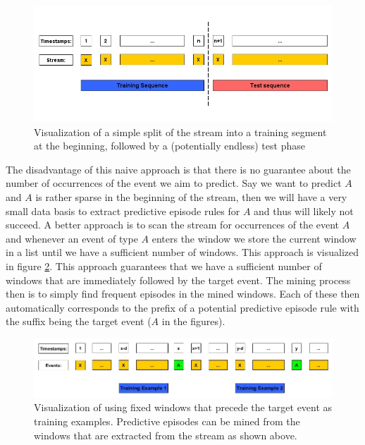 \begin{figure}[h]
	\centering
  	\includegraphics[width=\textwidth]{trainingDataNaive}
	\caption{Visualization of a simple split of the stream into a training segment at the beginning, followed by a (potentially endless) test phase}
	\label{fig_trainingDataNaive}
\end{figure}

The disadvantage of this naive approach is that there is no guarantee about the number of occurrences of the event we aim to predict. Say we want to predict $A$ and $A$ is rather sparse in the beginning of the stream, then we will have a very small data basis to extract predictive episode rules for $A$ and thus will likely not succeed. 
A better approach is to scan the stream for occurrences of the event $A$ and whenever an event of type $A$ enters the window we store the current window in a list until we have a sufficient number of windows. This approach is visualized in figure \ref{fig_trainingDataWindowsOfA}. This approach guarantees that we have a sufficient number of windows that are immediately followed by the target event. The mining process then is to simply find frequent episodes in the mined windows. Each of these then automatically corresponds to the prefix of a potential predictive episode rule with the suffix being the target event ($A$ in the figures).

\begin{figure}[h]
	\centering
  	\includegraphics[width=\textwidth]{trainingDataWindowsOfA}
	\caption{Visualization of using fixed windows that precede the target event as training examples. Predictive episodes can be mined from the windows that are extracted from the stream as shown above.}
	\label{fig_trainingDataWindowsOfA}
\end{figure}

